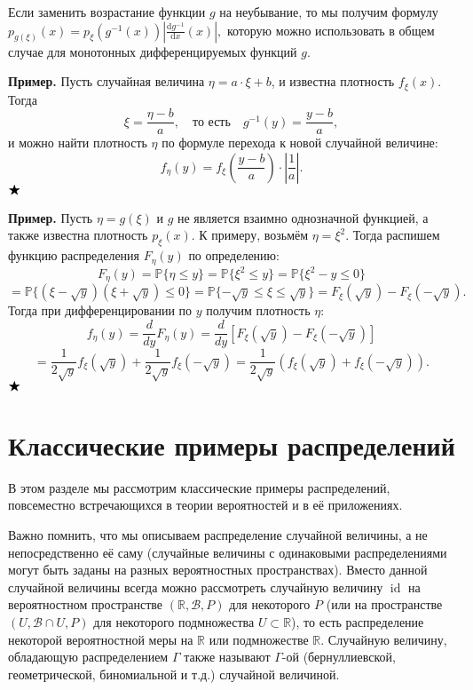 \documentclass[12pt]{article}
\numberwithin{theorem}{section}
\theoremstyle{definition}
\newenvironment{example}{\indent \textbf{Пример.}}{$ \hfill \bigstar $}
\newcommand{\RR}{\mathbb{R}}
\newcommand{\calB}{\mathcal{B}}
\newcommand{\id}{\operatorname{id}}
\newcommand{\diff}{\mathrm{d}}
\begin{document}
	Если заменить возрастание функции $ g $ на неубывание, то мы получим формулу
	$ p_{g(\xi)}(x) = p_{\xi}(g^{-1}(x))\left|\tfrac{\diff g^{-1}}{\diff x}(x)\right|, $
	которую можно использовать в общем случае для монотонных дифференцируемых функций $ g $.
	
	\begin{example}
		Пусть случайная величина \( \eta = a \cdot \xi + b \), и известна плотность \( f_\xi(x) \). Тогда
		\[
		\xi = \frac{\eta - b}{a}, \quad \text{то есть} \quad g^{-1}(y) = \frac{y - b}{a},
		\]
		и можно найти плотность \( \eta \) по формуле перехода к новой случайной величине:
		\[
		f_\eta(y) = f_\xi\left( \frac{y - b}{a} \right) \cdot \left| \frac{1}{a} \right|.
		\]
	\end{example}
	
	\begin{example}
		Пусть \( \eta = g(\xi) \) и $ g $ не является взаимно однозначной функцией, а также известна плотность \( p_\xi(x) \).  
		К примеру, возьмём \( \eta = \xi^2 \). Тогда распишем функцию распределения \( F_\eta(y) \) по определению:
		\[
		F_\eta(y) = \mathbb{P}\{\eta \leq y\} = \mathbb{P}\{\xi^2 \leq y\} = \mathbb{P}\{\xi^2 - y \leq 0\}
		\]
		\[
		= \mathbb{P}\{(\xi - \sqrt{y})(\xi + \sqrt{y}) \leq 0\} = \mathbb{P}\{-\sqrt{y} \leq \xi \leq \sqrt{y}\} 
		= F_\xi(\sqrt{y}) - F_\xi(-\sqrt{y}).
		\]
		Тогда при дифференцировании по \( y \) получим плотность \( \eta \):
		\[
		f_\eta(y) = \frac{d}{dy} F_\eta(y) = \frac{d}{dy} \left[F_\xi(\sqrt{y}) - F_\xi(-\sqrt{y})\right]
		\]
		\[
		= \frac{1}{2\sqrt{y}} f_\xi(\sqrt{y}) + \frac{1}{2\sqrt{y}} f_\xi(-\sqrt{y}) 
		= \frac{1}{2\sqrt{y}} \left( f_\xi(\sqrt{y}) + f_\xi(-\sqrt{y}) \right).
		\]
	\end{example}
	
	\section{Классические примеры распределений} 
	
	В этом разделе мы рассмотрим классические примеры распределений,
	повсеместно встречающихся в теории вероятностей и в её приложениях.
	
	Важно помнить, что мы описываем распределение случайной величины, а не непосредственно её саму 
	(случайные величины с одинаковыми распределениями могут быть заданы на разных вероятностных пространствах).
	Вместо данной случайной величины всегда можно рассмотреть случайную величину $ \id $ на вероятностном пространстве
	$ (\RR, \calB, P) $ для некоторого $ P $ 
	(или на пространстве $ (U, \calB \cap U, P) $ для некоторого подмножества $ U \subset \RR $),
	то есть распределение некоторой вероятностной меры на $ \RR $ или подмножестве $ \RR $.
	Случайную величину, обладающую распределением $ \Gamma $ также называют $ \Gamma $-ой (бернуллиевской, геометрической, биномиальной и т.д.) случайной величиной.
	
\end{document}
